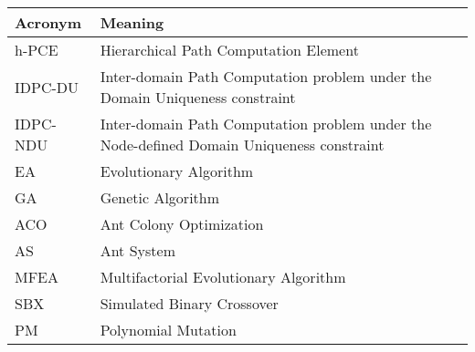 \fontsize{13}{16}
\selectfont
\begin{center}
	\begin{tabular}{|p{1in}|p{5in}|}
		\hline
		\textbf{Acronym} & \textbf{Meaning}  \\ \hline
		h-PCE & Hierarchical Path Computation Element	\\ \hline
		IDPC-DU & Inter-domain Path Computation problem under the Domain Uniqueness constraint \\ \hline
		IDPC-NDU & Inter-domain Path Computation problem under the Node-defined Domain Uniqueness constraint \\ \hline
		EA & Evolutionary Algorithm \\ \hline
		GA & Genetic Algorithm  \\ \hline
		ACO & Ant Colony Optimization \\ \hline
		AS & Ant System \\ \hline
		MFEA & Multifactorial Evolutionary Algorithm \\ \hline
		SBX & Simulated Binary Crossover\\ \hline
		PM & Polynomial Mutation\\ \hline
	\end{tabular}    
\end{center}


\pagebreak